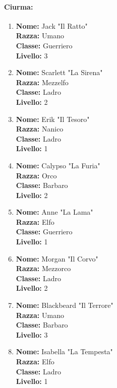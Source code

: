 \documentclass{article}
\begin{document}
                  \paragraph*{Ciurma:}
\begin{enumerate}
  \item \textbf{Nome:} Jack "Il Ratto"\\
  \textbf{Razza:} Umano\\
  \textbf{Classe:} Guerriero\\
  \textbf{Livello:} 3

  \item \textbf{Nome:} Scarlett "La Sirena"\\
  \textbf{Razza:} Mezzelfo\\
  \textbf{Classe:} Ladro\\
  \textbf{Livello:} 2

  \item \textbf{Nome:} Erik "Il Tesoro"\\
  \textbf{Razza:} Nanico\\
  \textbf{Classe:} Ladro\\
  \textbf{Livello:} 1

  \item \textbf{Nome:} Calypso "La Furia"\\
  \textbf{Razza:} Orco\\
  \textbf{Classe:} Barbaro\\
  \textbf{Livello:} 2

  \item \textbf{Nome:} Anne "La Lama"\\
  \textbf{Razza:} Elfo\\
  \textbf{Classe:} Guerriero\\
  \textbf{Livello:} 1

  \item \textbf{Nome:} Morgan "Il Corvo"\\
  \textbf{Razza:} Mezzorco\\
  \textbf{Classe:} Ladro\\
  \textbf{Livello:} 2

  \item \textbf{Nome:} Blackbeard "Il Terrore"\\
  \textbf{Razza:} Umano\\
  \textbf{Classe:} Barbaro\\
  \textbf{Livello:} 3

  \item \textbf{Nome:} Isabella "La Tempesta"\\
  \textbf{Razza:} Elfo\\
  \textbf{Classe:} Ladro\\
  \textbf{Livello:} 1


\end{enumerate}
\end{document}
